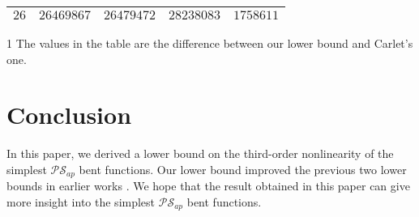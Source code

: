\documentclass[preprint,10pt]{elsarticle}
\newcommand{\0}{\textbf{0}}
\newcommand{\1}{\textbf{1}}
\theoremstyle{plain}
\begin{document}
\begin{table}
\begin{threeparttable}
\begin{tabular}{|c|c|c|c|c|}
                $26 $ &  $ 26469867    $       & $ 26479472 $     & $ 28238083 $     & $  1758611 $ \\  \hline
            \end{tabular}
            \begin{tablenotes}
                \footnotesize
                \item[1] The values in the table are the difference between our lower bound and Carlet's one.
            \end{tablenotes}
        \end{threeparttable}
        \label{table:MyTableLabel}
    \end{table}


\section{Conclusion}
    In this paper, we derived a lower bound on the third-order nonlinearity of the simplest $\mathcal{PS}_{ap}$ bent functions.
    Our lower bound improved the previous two lower bounds in earlier works \cite{Carlet2011NL_Profile_Dillon,TangCT2013NL_2bent}.
    We hope that the result obtained in this paper can give  more insight into the simplest $\mathcal{PS}_{ap}$ bent functions.



\end{document}
